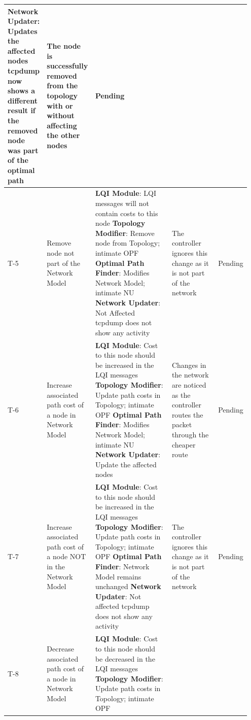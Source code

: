 \documentclass{article}
\begin{document}
{\begin{longtable}{  | p{0.1\linewidth} | p{0.2\linewidth} | p{0.35\linewidth} | p{0.2\linewidth} | p{0.1\linewidth} | }
\textbf{Network Updater}: Updates the affected nodes \newline 
tcpdump now shows a different result if the removed node was part of the optimal path &
The node is successfully removed from the topology with or without affecting the other nodes &
Pending\\
\hline
T-5 & 
Remove node not part of the Network Model & 
\textbf{LQI Module}: LQI messages will not contain costs to this node\newline 
\textbf{Topology Modifier}: Remove node from Topology; intimate OPF\newline 
\textbf{Optimal Path Finder}: Modifies Network Model; intimate NU\newline
\textbf{Network Updater}: Not Affected\newline
tcpdump does not show any activity &
The controller ignores this change as it is not part of the network &
Pending\\
\hline
T-6 & 
Increase associated path cost of a node in Network Model & 
\textbf{LQI Module}:  Cost to this node should be increased in the LQI messages\newline 
\textbf{Topology Modifier}: Update path costs in Topology; intimate OPF\newline 
\textbf{Optimal Path Finder}: Modifies Network Model; intimate NU\newline
\textbf{Network Updater}: Update the affected nodes\newline &
Changes in the network are noticed as the controller routes the packet through the cheaper route &
Pending\\
\hline
T-7 & 
Increase associated path cost of a node NOT in the Network Model & 
\textbf{LQI Module}: Cost to this node should be increased in the LQI messages\newline 
\textbf{Topology Modifier}: Update path costs in Topology; intimate OPF\newline 
\textbf{Optimal Path Finder}: Network Model remains unchanged\newline
\textbf{Network Updater}: Not affected\newline
tcpdump does not show any activity &
The controller ignores this change as it is not part of the network &
Pending\\
\hline
T-8 & 
Decrease associated path cost of a node in Network Model & 
\textbf{LQI Module}: Cost to this node should be decreased in the LQI messages\newline 
\textbf{Topology Modifier}: Update path costs in Topology; intimate OPF \newline 

\end{longtable}}
\end{document}
